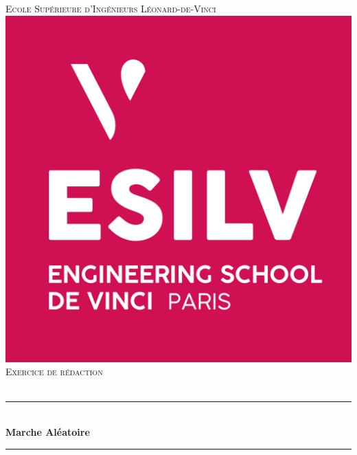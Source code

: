 \documentclass[12pt]{article}
\begin{document}
\begin{titlepage}
\newcommand{\HRule}{\rule{\linewidth}{0.5mm}} %
\center %

\textsc{\LARGE Ecole Supérieure d'Ingénieurs Léonard-de-Vinci}\\[1cm]
\includegraphics[scale=.4]{logo_esilv.png}\\[1cm]
\textsc{\Large Exercice de rédaction}\\[0.5cm]
\textsc{\large }\\[0.5cm]
\HRule \\[0.4cm]
{ \huge \bfseries Marche Aléatoire}\\[0.4cm]
\HRule \\[0.5cm]

\end{titlepage}
\end{document}
